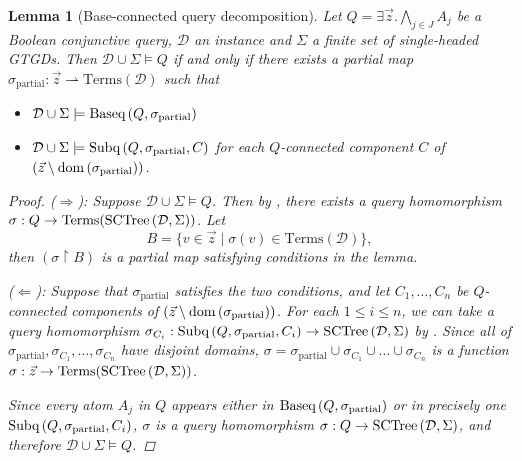 \documentclass[12pt]{report}
\theoremstyle{plain}
\newtheorem{lemma}[theorem]{Lemma}
\theoremstyle{definition}
\def\Terms{{\mathrm{Terms}}}
\newcommand{\dom}[1]{\ensuremath{\normalfont{\operatorname{dom}} \left( #1 \right)}}
\newcommand{\SCTree}[2]{\ensuremath{\normalfont{\textrm{SCTree}} \left( #1, #2 \right)}}
\newcommand{\Subq}[3]{\ensuremath{\normalfont{\textrm{Subq}} \left( #1, #2, #3 \right)}}
\newcommand{\Baseq}[2]{\ensuremath{\normalfont{\textrm{Baseq}} \left( #1, #2 \right)}}
\begin{document}
\begin{lemma}[Base-connected query decomposition]
\label{bcq-base-connected-query-decomposition}
  Let $Q = \exists \vec{z}. \bigwedge_{j \in J} A_j$ be a Boolean conjunctive query, $\mathcal{D}$ an instance and $\Sigma$ a finite set of single-headed GTGDs. Then $\mathcal{D} \cup \Sigma \models Q$ if and only if there exists a partial map $\sigma_\mathrm{partial}: \vec{z} \rightharpoonup \Terms(\mathcal{D})$ such that
  \begin{itemize}
    \item $\mathcal{D} \cup \Sigma \models \Baseq{Q}{\sigma_\mathrm{partial}}$
    \item $\mathcal{D} \cup \Sigma \models \Subq{Q}{\sigma_\mathrm{partial}}{C}$ for each $Q$-connected component $C$ of \newline $(\vec{z} \setminus\nobreak \mathrm{\dom{\sigma_\mathrm{partial}}})$.
  \end{itemize}
  \begin{proof}
    ($\Longrightarrow$): Suppose $\mathcal{D} \cup \Sigma \models Q$. Then by , there exists a query homomorphism $\sigma: Q \rightarrow \Terms(\SCTree{\mathcal{D}}{\Sigma})$. Let $$B = \{ v \in \vec{z} \mid \sigma(v) \in \Terms(\mathcal{D}) \},$$ then $(\sigma \upharpoonright B)$ is a partial map satisfying conditions in the lemma.

    ($\Longleftarrow$): Suppose that $\sigma_\mathrm{partial}$ satisfies the two conditions, and let $C_1, \ldots, C_n$ be $Q$-connected components of $(\vec{z} \setminus\nobreak \mathrm{\dom{\sigma_\mathrm{partial}}})$. For each $1 \leq i \leq n$, we can take a query homomorphism $\sigma_{C_i}: \Subq{Q}{\sigma_\mathrm{partial}}{C_i} \rightarrow \SCTree{\mathcal{D}}{\Sigma}$ by . Since all of $\sigma_\mathrm{partial}, \sigma_{C_1}, \ldots, \sigma_{C_n}$ have disjoint domains, $\sigma = \sigma_\mathrm{partial} \cup \sigma_{C_1} \cup \ldots \cup \sigma_{C_n}$ is a function $\sigma: \vec{z} \rightarrow \Terms(\SCTree{\mathcal{D}}{\Sigma})$.
    
    Since every atom $A_j$ in $Q$ appears either in $\Baseq{Q}{\sigma_\mathrm{partial}}$ or in precisely one $\Subq{Q}{\sigma_\mathrm{partial}}{C_i}$, $\sigma$ is a query homomorphism $\sigma: Q \rightarrow \SCTree{\mathcal{D}}{\Sigma}$, and therefore $\mathcal{D} \cup \Sigma \models Q$.
  \end{proof}
\end{lemma}
\end{document}
